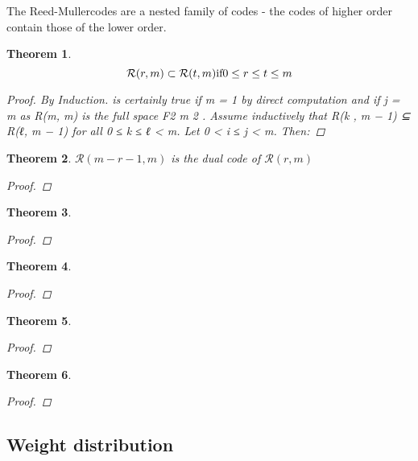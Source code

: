 \documentclass{article}
\newcommand{\RM}[2]{\ensuremath{\mathcal{R}(#1,#2)}}
\newcommand{\rem}{Reed-Muller}
\newtheorem{thm}{Theorem}
\begin{document}
The \rem codes are a nested family of codes - the codes of higher order contain those of the lower order.
\begin{thm}
\begin{equation*}
\RM{r}{m} \subset \RM{t}{m} 
\text{if} 0 \leq r \leq t \leq m \\
\end{equation*}

\begin{proof}
By Induction.
 is certainly true if m 
= 1 by direct computation and if j = m as R(m, m) 
is the full space F2 
m 
2 . Assume inductively that 
R(k , m − 1) ⊆ R(ℓ, m − 1) for all 0 ≤ k ≤ 
ℓ < m. Let 0 < i 
≤ j < m. Then: 
\end{proof}
\end{thm}



\begin{thm}
$\RM{m-r-1}{m}$ is the dual code of $\RM{r}{m}$
\begin{proof}
\end{proof}
\end{thm}

\begin{thm}

\begin{proof}
\end{proof}
\end{thm}


\begin{thm}

\begin{proof}
\end{proof}
\end{thm}


\begin{thm}

\begin{proof}
\end{proof}
\end{thm}


\begin{thm}

\begin{proof}
\end{proof}
\end{thm}

\subsection {Weight distribution}
\end{document}

